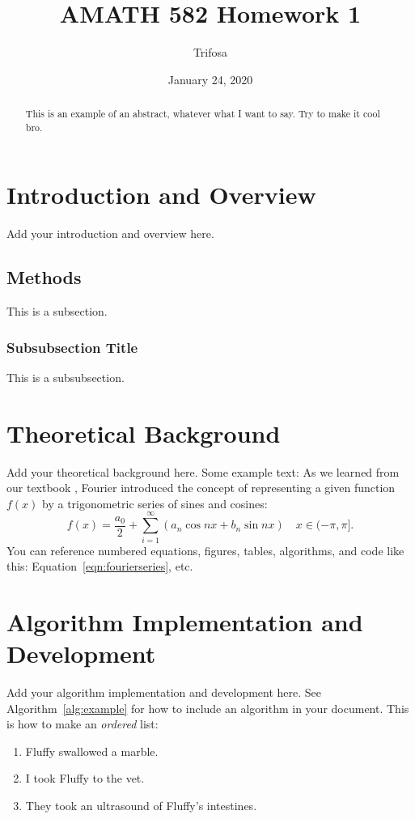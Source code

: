 \documentclass{article}
\title{AMATH 582 Homework 1}
\author{Trifosa}
\date{January 24, 2020}
\begin{document}
\maketitle

\begin{abstract}
    This is an example of an abstract, whatever what I want to say. Try to make it cool bro. 
\end{abstract}

\section{Introduction and Overview}
Add your introduction and overview here.

\subsection{Methods}
This is a subsection.

\subsubsection{Subsubsection Title}
This is a subsubsection.

\section{Theoretical Background}
Add your theoretical background here. Some example text: As we learned from our textbook \cite{webeck_2018,kutz_2013}, Fourier introduced the concept of representing a given function $f(x)$ by a trigonometric series of sines and cosines:
\begin{equation}
    f(x) = \frac{a_0}{2} + \sum_{i=1}^\infty \left(a_n\cos{nx} + b_n\sin{nx}\right) \quad x \in (-\pi,\pi].
    \label{eqn:fourierseries}
\end{equation}
You can reference numbered equations, figures, tables, algorithms, and code like this: Equation~\ref{eqn:fourierseries}, etc.

\section{Algorithm Implementation and Development}
Add your algorithm implementation and development here. See Algorithm~\ref{alg:example} for how to include an algorithm in your document. This is how to make an \textit{ordered} list:
\begin{enumerate}
    \item Fluffy swallowed a marble.
    \item I took Fluffy to the vet.
    \item They took an ultrasound of Fluffy's intestines.
\end{enumerate}
\end{document}
